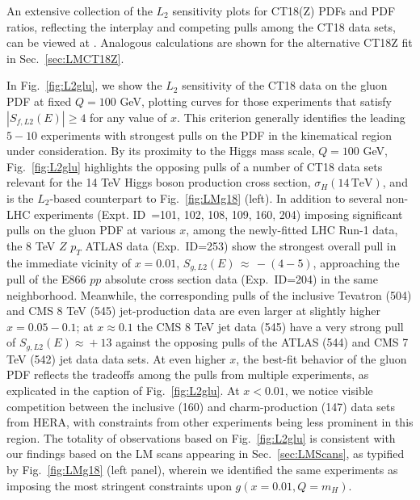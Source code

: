 An extensive collection of the $L_2$
sensitivity plots for CT18(Z) PDFs and PDF ratios, reflecting the
interplay and competing pulls among the CT18 data sets, 
can be viewed at \cite{CT18L2Sensitivity}. Analogous calculations are shown for the
alternative CT18Z fit in Sec.~\ref{sec:LMCT18Z}.

In Fig.~\ref{fig:L2glu}, we show the $L_2$ sensitivity of the CT18 data
on the gluon PDF at fixed $Q\! =\! 100$ GeV, plotting curves for those
experiments that satisfy $|S_{f, L2}(E)| \ge 4$ for any value of $x$.
This criterion generally identifies the leading $5-10$ experiments with
strongest pulls on the PDF in the kinematical region under consideration.
By its proximity to the Higgs mass scale, $Q\!=\!100$ GeV,
Fig.~\ref{fig:L2glu} highlights the opposing pulls of a number of CT18
data sets relevant for the 14 TeV Higgs boson production cross section,
$\sigma_H (14\,\mathrm{TeV})$, and is the $L_2$-based counterpart
to Fig.~\ref{fig:LMg18} (left). In addition to several non-LHC experiments (Expt. ID~=101, 102, 108, 109, 160, 204) 
imposing significant pulls on the gluon PDF at various $x$, 
among the newly-fitted LHC Run-1 data, the 8 TeV $Z$ $p_T$ ATLAS data
(Exp.~ID=253) show the strongest overall pull in the immediate vicinity of $x=0.01$, $S_{g, L2}(E)\, \approx\, -(4\!-\!5)$,  approaching the pull of the E866 $pp$
absolute cross section data (Exp.~ID=204) in the same neighborhood.
Meanwhile, the corresponding pulls of the inclusive Tevatron (504) and CMS 8 TeV (545) jet-production data  are even larger
at slightly higher $x\! = \! 0.05-0.1$; at $x\approx 0.1$ the CMS 8 TeV jet data (545)
have a very strong pull of $S_{g, L2}(E)\! \approx\! +13$ against the opposing pulls of the ATLAS (544) and CMS 7 TeV (542) jet data data sets. At even higher $x$, the best-fit behavior of the gluon PDF reflects the tradeoffs among the pulls from multiple experiments, as explicated in the caption of Fig.~\ref{fig:L2glu}. 
At $x\! < \! 0.01$, we notice visible competition between the inclusive (160) and charm-production (147) data sets from HERA, with constraints from other experiments being less prominent in this region. The totality of observations based on Fig.~\ref{fig:L2glu} is consistent
with our findings based on the LM scans appearing in Sec.~\ref{sec:LMScans}, as typified by
Fig.~\ref{fig:LMg18} (left panel), wherein we identified the same experiments as imposing
the most stringent constraints upon $g(x\!=\!0.01, Q\!=\!m_H)$.

